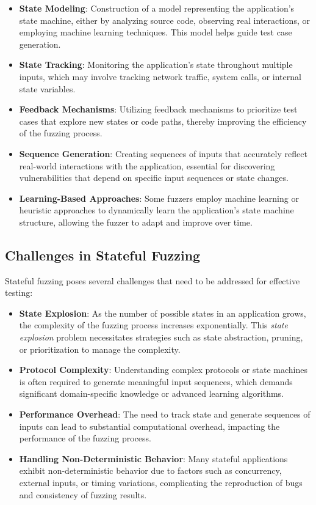 \begin{itemize}
    \item \textbf{State Modeling}: Construction of a model representing the application's state machine, either by analyzing source code, observing real interactions, or employing machine learning techniques. This model helps guide test case generation.
    
    \item \textbf{State Tracking}: Monitoring the application's state throughout multiple inputs, which may involve tracking network traffic, system calls, or internal state variables.
    
    \item \textbf{Feedback Mechanisms}: Utilizing feedback mechanisms to prioritize test cases that explore new states or code paths, thereby improving the efficiency of the fuzzing process.
    
    \item \textbf{Sequence Generation}: Creating sequences of inputs that accurately reflect real-world interactions with the application, essential for discovering vulnerabilities that depend on specific input sequences or state changes.
    
    \item \textbf{Learning-Based Approaches}: Some fuzzers employ machine learning or heuristic approaches to dynamically learn the application's state machine structure, allowing the fuzzer to adapt and improve over time.
\end{itemize}

\subsection{Challenges in Stateful Fuzzing}
Stateful fuzzing poses several challenges that need to be addressed for effective testing:

\begin{itemize}
    \item \textbf{State Explosion}: As the number of possible states in an application grows, the complexity of the fuzzing process increases exponentially. This \textit{state explosion} problem necessitates strategies such as state abstraction, pruning, or prioritization to manage the complexity.
    
    \item \textbf{Protocol Complexity}: Understanding complex protocols or state machines is often required to generate meaningful input sequences, which demands significant domain-specific knowledge or advanced learning algorithms.
    
    \item \textbf{Performance Overhead}: The need to track state and generate sequences of inputs can lead to substantial computational overhead, impacting the performance of the fuzzing process.
    
    \item \textbf{Handling Non-Deterministic Behavior}: Many stateful applications exhibit non-deterministic behavior due to factors such as concurrency, external inputs, or timing variations, complicating the reproduction of bugs and consistency of fuzzing results.
\end{itemize}

